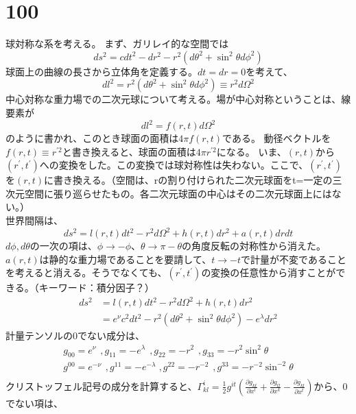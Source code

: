 \documentclass{jsarticle}
\newcommand{\pder}[2][]{\frac{\partial#1}{\partial#2}}
\newcommand{\pderx}[2][]{\pder[#1]{x^{#2}}}
\newcommand{\pdergx}[2][]{\pderx[g_{#1}]{#2}}
\newcommand{\half}{\frac{1}{2}}
\newcommand{\hfpt}{\hspace{5pt}}
\newcommand{\beq}{\begin{equation}}
\newcommand{\eeq}{\end{equation}}
\begin{document}
\section{100}
球対称な系を考える。
まず、ガリレイ的な空間では
\beq
ds^2 = cdt^2 - dr^2 - r^2(d\theta^2 + \sin^2\theta d\phi^2)
\eeq
球面上の曲線の長さから立体角を定義する。$dt = dr = 0$を考えて、
\beq
    dl^2 = r^2 (d\theta^2 + \sin^2\theta d\phi^2) \equiv r^2 d\Omega^2
\eeq
中心対称な重力場での二次元球について考える。場が中心対称ということは、線要素が
\beq
    dl^2 = f(r, t)d\Omega^2
\eeq
のように書かれ、このとき球面の面積は$4\pi f(r,t)$である。
動径ベクトルを$f(r, t) \equiv r^{\prime 2}$と書き換えると、球面の面積は$4\pi r^{\prime 2}$になる。
いま、$(r,t)$から$(r^\prime , t^\prime)$への変換をした。この変換では球対称性は失わない。ここで、$(r^\prime, t^\prime)$を$(r,t)$に書き換える。（空間は、rの割り付けられた二次元球面をt=一定の三次元空間に張り巡らせたもの。各二次元球面の中心はその二次元球面上にはない。）\\
世界間隔は、
\beq
ds^2 = l(r, t) dt^ 2 -r^2 d\Omega^2 + h(r, t) dr^2 + a(r, t) dr dt
\eeq
$d\phi, d\theta$の一次の項は、$\phi \rightarrow -\phi$、$\theta \rightarrow \pi - \theta$の角度反転の対称性から消えた。
$a(r, t)$は静的な重力場であることを要請して、$t \rightarrow -t$で計量が不変であることを考えると消える。そうでなくても、$(r^\prime, t^\prime)$の変換の任意性から消すことができる。（キーワード：積分因子？）
\begin{align}
    ds^2 &= l(r, t) dt^ 2 -r^2 d\Omega^2 + h(r, t) dr^2\\
         &= e^\nu c^2 dt^ 2 -r^2 (d\theta^2 + \sin^2\theta d\phi^2) - e^\lambda dr^2
\end{align}
計量テンソルの$0$でない成分は、
\begin{align}
    g_{00} = e^\nu \hfpt , g_{11} = -e^\lambda\hfpt ,g_{22} = -r^2\hfpt ,g_{33} = -r^2 \sin^2\theta\\
    g^{00} = e^{-\nu} \hfpt , g^{11} = -e^{-\lambda\hfpt} ,g^{22} = -r^{-2}\hfpt ,g^{33} = -r^{-2} \sin^{-2}\theta\\
\end{align}
クリストッフェル記号の成分を計算すると、$\Gamma^i_{kl}=\half g^{it}(\pdergx[kt]{l} + \pdergx[tl]{k} - \pdergx[kl]{t})$から、$0$でない項は、
\end{document}

